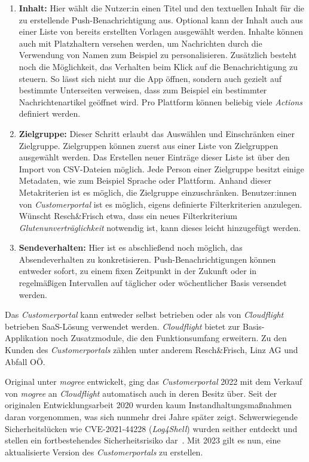 \begin{enumerate}
    \item \textbf{Inhalt:} Hier wählt die Nutzer:in einen Titel und den textuellen Inhalt für die zu erstellende Push-Benachrichtigung aus. Optional kann der Inhalt auch aus einer Liste von bereits erstellten Vorlagen ausgewählt werden. Inhalte können auch mit Platzhaltern versehen werden, um Nachrichten durch die Verwendung von Namen zum Beispiel zu personalisieren. Zusätzlich besteht noch die Möglichkeit, das Verhalten beim Klick auf die Benachrichtigung zu steuern. So lässt sich nicht nur die App öffnen, sondern auch gezielt auf bestimmte Unterseiten verweisen, dass zum Beispiel ein bestimmter Nachrichtenartikel geöffnet wird. Pro Plattform können beliebig viele \textit{Actions} definiert werden.
    \item \textbf{Zielgruppe:} Dieser Schritt erlaubt das Auswählen und Einschränken einer Zielgruppe. Zielgruppen können zuerst aus einer Liste von Zielgruppen ausgewählt werden. Das Erstellen neuer Einträge dieser Liste ist über den Import von CSV-Dateien möglich. Jede Person einer Zielgruppe besitzt einige Metadaten, wie zum Beispiel Sprache oder Plattform. Anhand dieser Metakriterien ist es möglich, die Zielgruppe einzuschränken. Benutzer:innen von \textit{Customerportal} ist es möglich, eigens definierte Filterkriterien anzulegen. Wünscht Resch\&Frisch etwa, dass ein neues Filterkriterium \textit{Glutenunverträglichkeit} notwendig ist, kann dieses leicht hinzugefügt werden.
    \item \textbf{Sendeverhalten:} Hier ist es abschließend noch möglich, das Absendeverhalten zu konkretisieren. Push-Benachrichtigungen können entweder sofort, zu einem fixen Zeitpunkt in der Zukunft oder in regelmäßigen Intervallen auf täglicher oder wöchentlicher Basis versendet werden.
\end{enumerate}

Das \textit{Customerportal} kann entweder selbst betrieben oder als von \textit{Cloudflight} betrieben SaaS-Lösung verwendet werden. \textit{Cloudflight} bietet zur Basis-Applikation noch Zusatzmodule, die den Funktionsumfang erweitern. Zu den Kunden des \textit{Customerportals} zählen unter anderem Resch\&Frisch, Linz AG und Abfall OÖ. 

Original unter \textit{mogree} entwickelt, ging das \textit{Customerportal} 2022 mit dem Verkauf von \textit{mogree} an \textit{Cloudflight} automatisch auch in deren Besitz über. Seit der originalen Entwicklungsarbeit 2020 wurden kaum Instandhaltungsmaßnahmen daran vorgenommen, was sich nunmehr drei Jahre später zeigt. Schwerwiegende Sicherheitslücken wie CVE-2021-44228 (\textit{Log4Shell}) wurden seither entdeckt und stellen ein fortbestehendes Sicherheitsrisiko dar~\parencite{cvelog4shell}. Mit 2023 gilt es nun, eine aktualisierte Version des \textit{Customerportals} zu erstellen.

